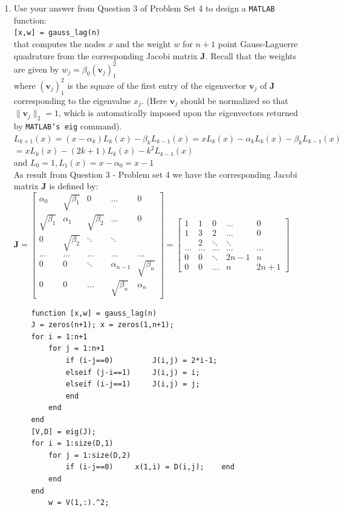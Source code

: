 \documentclass[14pt,a4paper]{article}
\begin{document}
\begin{enumerate}
	\label{2b}	
	\item Use your answer from Question 3 of Problem Set 4 to design a \texttt{MATLAB} function:\\ \hspace*{5cm} \texttt{[x,w] = gauss\_lag(n)}\\
	that computes the nodes $x$ and the weight $w$ for $n+1$ point Gauss-Laguerre quadrature from the corresponding Jacobi matrix \textbf{J}. Recall that the weights are given by $w_j = \beta_0(\textbf{v}_j)_1^2$ \\
	where $(\textbf{v}_j)_1^2$ is the square of the first entry of the eigenvector $\textbf{v}_j$ of \textbf{J} corresponding to the eigenvalue $x_j$. (Here $\textbf{v}_j$ should be normalized so that $\|\textbf{v}_j\|_2 = 1$, which is automatically imposed upon the eigenvectors returned by \texttt{MATLAB's eig} command).\\
	$ L_{k+1}(x) = (x-\alpha_k)L_k(x)-\beta_kL_{k-1}(x) = xL_k(x) - \alpha_kL_k(x) - \beta_kL_{k-1}(x)$\\
	\hspace*{6.8cm} $= xL_k(x) - (2k+1)L_k(x) - k^2L_{k-1}(x)$\\
	and $L_0 = 1, L_1(x) = x - \alpha_0 = x-1$\\
	As result from Question 3 - Problem set 4 we have the corresponding Jacobi matrix \textbf{J} is defined by:\\
	\hspace*{1cm} $ \textbf{J} = \begin{bmatrix} \alpha_0 & \sqrt{\beta_1} & 0 & ... & 0 \\ \sqrt{\beta_1} & \alpha_1 & \sqrt{\beta_2} & ... & 0 \\ 0 & \sqrt{\beta_2} & \ddots & \ddots \\ ...&...&...&...&...\\ 0 & 0 & \ddots & \alpha_{n-1} & \sqrt{\beta_n} \\ 0 & 0 & ... & \sqrt{\beta_n} & \alpha_n \end{bmatrix} = \begin{bmatrix} 1 & 1 & 0 & ... & 0 \\ 1 & 3 & 2 & ... & 0 \\  & 2 & \ddots & \ddots \\...&...&...&...&...\\ 0 & 0 & \ddots & 2n-1 & n \\ 0 & 0 & ... & n & 2n+1 \end{bmatrix}$
	\begin{lstlisting}
	function [x,w] = gauss_lag(n)
	J = zeros(n+1);	x = zeros(1,n+1);
	for i = 1:n+1
		for j = 1:n+1
			if (i-j==0) 		J(i,j) = 2*i-1;
			elseif (j-i==1)		J(i,j) = i;
			elseif (i-j==1)		J(i,j) = j;
			end
		end
	end
	[V,D] = eig(J);
	for i = 1:size(D,1)
		for j = 1:size(D,2)
			if (i-j==0)		x(1,i) = D(i,j);	end
		end
	end
		w = V(1,:).^2;
	\end{lstlisting}
	

\end{enumerate}
\end{document}
